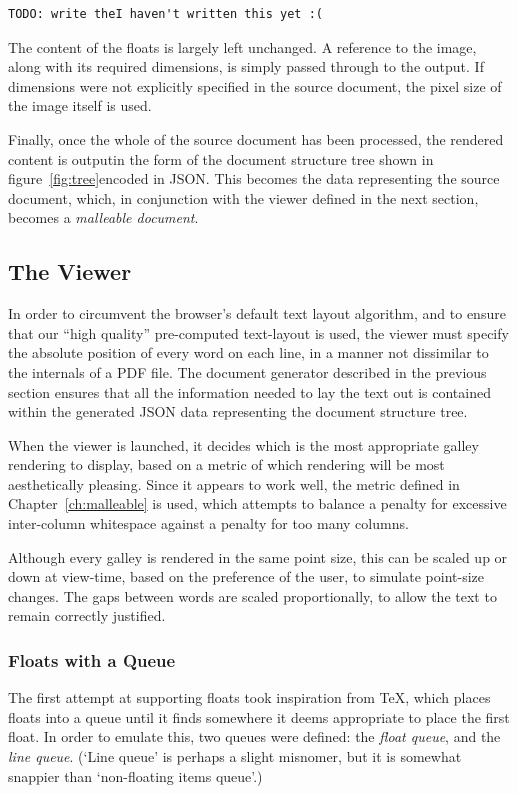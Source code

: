 \begin{lstlisting}[label=lst:parsplitter,captionpos=b,float,caption={Algorithm followed by the galley renderer}]
 TODO: write theI haven't written this yet :(
\end{lstlisting}


The content of the floats is largely left unchanged. A reference to the image, along with its required dimensions, is simply passed through to the output. If dimensions were not explicitly specified in the source document, the pixel size of the image itself is used.

Finally, once the whole of the source document has been processed, the rendered content is output\ed in the form of the document structure tree shown in figure~\ref{fig:tree}\ed encoded in JSON. This becomes the data representing the source document, which, in conjunction with the viewer defined in the next section, becomes a \emph{malleable document}.




\subsection{The Viewer}
\label{sec:viewer}

In order to circumvent the browser's default text layout algorithm, and to ensure that our ``high quality'' pre-computed text-layout is used, the viewer must specify the absolute position of every word on each line, in a manner not dissimilar to the internals of a PDF file. The document generator described in the previous section ensures that all the information needed to lay the text out is contained within the generated JSON data representing the document structure tree.


When the viewer is launched, it decides which is the most appropriate galley rendering to display, based on a metric of which rendering will be most aesthetically pleasing. Since it appears to work well, the metric defined in Chapter~\ref{ch:malleable} is used, which attempts to balance a penalty for excessive inter-column whitespace against a penalty for too many columns. 

Although every galley is rendered in the same point size, this can be scaled up or down at view-time, based on the preference of the user, to simulate point-size changes. The gaps between words are scaled proportionally, to allow the text to remain correctly justified.




\subsubsection{Floats with a Queue}
The first attempt at supporting floats took inspiration from \TeX, which places floats into a queue until it finds somewhere it deems appropriate to place the first float. In order to emulate this, two queues were defined: the \emph{float queue}, and the \emph{line queue}. (`Line queue' is perhaps a slight misnomer, but it is somewhat snappier than `non-floating items queue'.)


